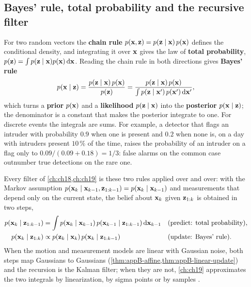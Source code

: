 \subsection{Bayes' rule, total probability and the recursive filter}

For two random vectors the \textbf{chain rule} $p(\mathbf{x}, \mathbf{z}) = p(\mathbf{z}
\mid \mathbf{x})\,p(\mathbf{x})$ defines the conditional density, and integrating it
over $\mathbf{x}$ gives the law of \textbf{total probability}, $p(\mathbf{z}) = \int p(\mathbf{z} \mid \mathbf{x})p(\mathbf{x})\,\mathrm{d}\mathbf{x}$.
Reading the chain rule in both directions gives \textbf{Bayes'
rule}
\begin{equation}
  p(\mathbf{x} \mid \mathbf{z}) = \frac{p(\mathbf{z} \mid \mathbf{x})\,p(\mathbf{x})}{p(\mathbf{z})}
  = \frac{p(\mathbf{z} \mid \mathbf{x})\,p(\mathbf{x})}{\int p(\mathbf{z} \mid \mathbf{x}')\,p(\mathbf{x}')\,\mathrm{d}\mathbf{x}'} ,
  \label{eq:appB-bayes}
\end{equation}
which turns a \textbf{prior} $p(\mathbf{x})$ and a \textbf{likelihood} $p(\mathbf{z}
\mid \mathbf{x})$ into the \textbf{posterior} $p(\mathbf{x} \mid \mathbf{z})$; the
denominator is a constant that makes the posterior integrate to one. For
discrete events the integrals are sums. For example, a detector that flags an intruder with probability $0.9$ when one is present and $0.2$ when none is, on a day with intruders present $10\,\%$ of the time, raises the probability of an intruder on a flag only to $0.09/(0.09 + 0.18) = 1/3$: false alarms on the common case outnumber true detections on the rare one.

Every filter of \cref{ch:ch18,ch:ch19} is these two rules applied over and
over: with the Markov assumption $p(\mathbf{x}_k \mid \mathbf{x}_{k-1},
\mathbf{z}_{1:k-1}) = p(\mathbf{x}_k \mid \mathbf{x}_{k-1})$ and measurements that depend
only on the current state, the belief about $\mathbf{x}_k$ given $\mathbf{z}_{1:k}$ is
obtained in two steps,
\begin{align}
  p(\mathbf{x}_k \mid \mathbf{z}_{1:k-1}) &= \int p(\mathbf{x}_k \mid \mathbf{x}_{k-1})\,p(\mathbf{x}_{k-1} \mid \mathbf{z}_{1:k-1})\,\mathrm{d}\mathbf{x}_{k-1} && \text{(predict: total probability)},
  \label{eq:appB-predict}\\
  p(\mathbf{x}_k \mid \mathbf{z}_{1:k}) &\propto p(\mathbf{z}_k \mid \mathbf{x}_k)\,p(\mathbf{x}_k \mid \mathbf{z}_{1:k-1}) && \text{(update: Bayes' rule)}.
  \label{eq:appB-update}
\end{align}
When the motion and measurement models are linear with Gaussian noise, both
steps map Gaussians to Gaussians (\cref{thm:appB-affine,thm:appB-linear-update})
and the recursion is the Kalman filter; when they are not, \cref{ch:ch19}
approximates the two integrals by linearization, by sigma points or by
samples \cite{thrun2005probabilistic,sarkka2013bayesian}.

